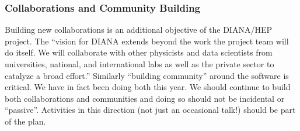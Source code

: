 \begin{frame}
\frametitle{Collaborations and Community Building}

Building new collaborations is an additional objective of the DIANA/HEP 
project. The ``vision for DIANA extends beyond the work the project team will 
do itself.  We will collaborate with other physicists and data scientists
from universities, national, and international labs as well as the private 
sector to catalyze a broad effort.''
\vskip 0.15in
Similarly ``building community'' around the software is critical.
\vskip 0.15in
We have in fact been doing both this year. We should continue to build both collaborations and communities and doing so should not be incidental or ``passive''. Activities in this direction (not just an occasional talk!) should be part of the plan.
\end{frame}



